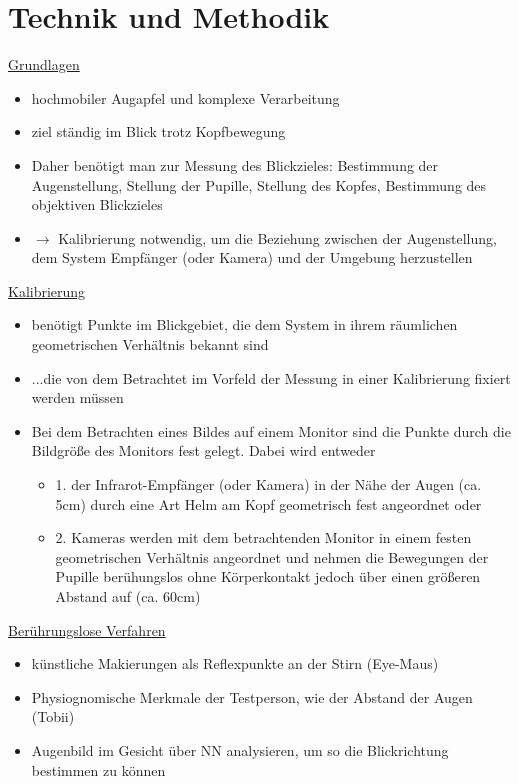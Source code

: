 \documentclass[a4paper,10pt,oneside]{article}
\begin{document}
\section{Technik und Methodik}
\underline{Grundlagen} \\
	\begin{itemize}
		\item hochmobiler Augapfel und komplexe Verarbeitung
		\item ziel ständig im Blick trotz Kopfbewegung
		\item Daher benötigt man zur Messung des Blickzieles: Bestimmung der Augenstellung, Stellung der Pupille, Stellung des Kopfes, Bestimmung des objektiven Blickzieles
		\item $\rightarrow$ Kalibrierung notwendig, um die Beziehung zwischen der Augenstellung, dem System Empfänger (oder Kamera) und der Umgebung herzustellen
	\end{itemize}
	
\underline{Kalibrierung} \\
	\begin{itemize}
		\item benötigt Punkte im Blickgebiet, die dem System in ihrem räumlichen geometrischen Verhältnis bekannt sind
		\item ...die von dem Betrachtet im Vorfeld der Messung in einer Kalibrierung fixiert werden müssen
		\item Bei dem Betrachten eines Bildes auf einem Monitor sind die Punkte durch die Bildgröße des Monitors fest gelegt. Dabei wird entweder
			\begin{itemize}
				\item 1. der Infrarot-Empfänger (oder Kamera) in der Nähe der Augen (ca. 5cm) durch eine Art Helm am Kopf geometrisch fest angeordnet oder
				\item 2. Kameras werden mit dem betrachtenden Monitor in einem festen geometrischen Verhältnis angeordnet und nehmen die Bewegungen der Pupille berühungslos ohne Körperkontakt jedoch über einen größeren Abstand auf (ca. 60cm)
			\end{itemize}
	\end{itemize}
 		
\underline{Berührungslose Verfahren} \\
	\begin{itemize}
		\item künstliche Makierungen als Reflexpunkte an der Stirn (Eye-Maus)
		\item Physiognomische Merkmale der Testperson, wie der Abstand der Augen (Tobii)
		\item Augenbild im Gesicht über NN analysieren, um so die Blickrichtung bestimmen zu können
	\end{itemize}
\end{document}
